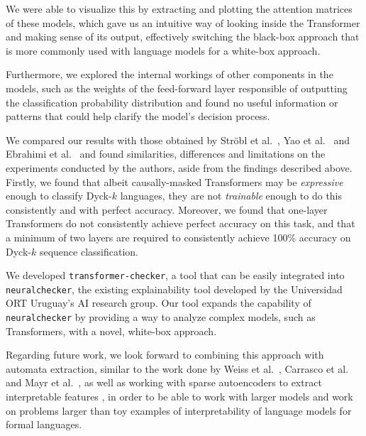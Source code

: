 We were able to visualize this by extracting and plotting the attention matrices of these models, which gave us an intuitive way of looking inside the Transformer and making sense of its output, effectively switching the black-box approach that is more commonly used with language models for a white-box approach.

Furthermore, we explored the internal workings of other components in the models, such as the weights of the feed-forward layer responsible of outputting the classification probability distribution and found no useful information or patterns that could help clarify the model's decision process.

We compared our results with those obtained by Ströbl et al.~\cite{strobl2024formal}, Yao et al.~\cite{bounded-hierarchical-languages} and Ebrahimi et al.~\cite{sa-nets-dyck-n} and found similarities, differences and limitations on the experiments conducted by the authors, aside from the findings described above. Firstly, we found that albeit causally-masked Transformers may be \emph{expressive} enough to classify Dyck-$k$ languages, they are not \emph{trainable} enough to do this consistently and with perfect accuracy. Moreover, we found that one-layer Transformers do not consistently achieve perfect accuracy on this task, and that a minimum of two layers are required to consistently achieve 100\% accuracy on Dyck-$k$ sequence classification.

We developed \verb|transformer-checker|, a tool that can be easily integrated into \verb|neuralchecker|, the existing explainability tool developed by the Universidad ORT Uruguay's AI research group. Our tool expands the capability of \verb|neuralchecker| by providing a way to analyze complex models, such as Transformers, with a novel, white-box approach.

Regarding future work, we look forward to combining this approach with automata extraction, similar to the work done by Weiss et al.~\cite{weiss-rnn-automata}, Carrasco et al.~\cite{carrasco-llm} and Mayr et al.~\cite{mayr-automata}, as well as working with sparse autoencoders to extract interpretable features \cite{sae-lm, bricken-monosemanticity}, 
in order to be able to work with larger models and work on problems larger than toy examples of interpretability of language models for formal languages.

